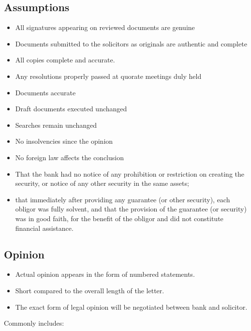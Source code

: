 \documentclass[
]{article}
\providecommand{\tightlist}{%
  \setlength{\itemsep}{0pt}\setlength{\parskip}{0pt}}
\begin{document}
\hypertarget{assumptions}{%
\subsection{Assumptions}\label{assumptions}}

\begin{itemize}
\tightlist
\item
  All signatures appearing on reviewed documents are genuine
\item
  Documents submitted to the solicitors as originals are authentic and
  complete
\item
  All copies complete and accurate.
\item
  Any resolutions properly passed at quorate meetings duly held
\item
  Documents accurate
\item
  Draft documents executed unchanged
\item
  Searches remain unchanged
\item
  No insolvencies since the opinion
\item
  No foreign law affects the conclusion
\item
  That the bank had no notice of any prohibition or restriction on
  creating the security, or notice of any other security in the same
  assets;
\item
  that immediately after providing any guarantee (or other security),
  each obligor was fully solvent, and that the provision of the
  guarantee (or security) was in good faith, for the benefit of the
  obligor and did not constitute financial assistance.
\end{itemize}

\hypertarget{opinion}{%
\subsection{Opinion}\label{opinion}}

\begin{itemize}
\tightlist
\item
  Actual opinion appears in the form of numbered statements.
\item
  Short compared to the overall length of the letter.
\item
  The exact form of legal opinion will be negotiated between bank and
  solicitor.
\end{itemize}

Commonly includes:
\end{document}
